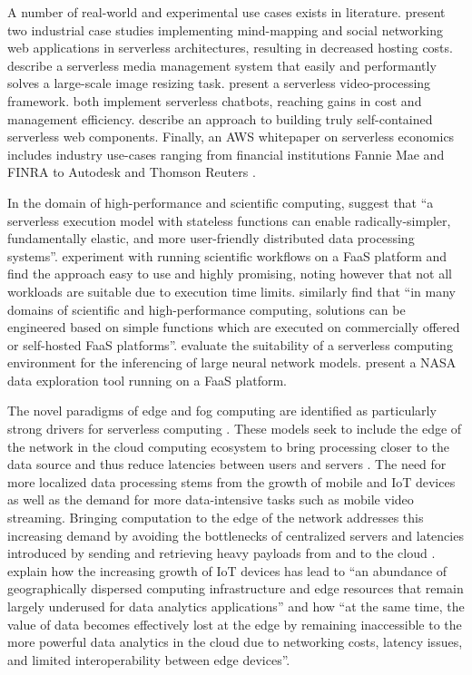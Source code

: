 A number of real-world and experimental use cases exists in literature. \textcite{adzic2017serverless} present two industrial case studies implementing mind-mapping and social networking web applications in serverless architectures, resulting in decreased hosting costs. \textcite{mcgrath16cloudEventParadigms} describe a serverless media management system that easily and performantly solves a large-scale image resizing task. \textcite{fouladi2017encoding} present a serverless video-processing framework. \textcite{yan16chatbot,lehva18chatbot} both implement serverless chatbots, reaching gains in cost and management efficiency. \textcite{ast17webcomponent} describe an approach to building truly self-contained serverless web components. Finally, an AWS whitepaper on serverless economics includes industry use-cases ranging from financial institutions Fannie Mae and FINRA to Autodesk and Thomson Reuters \parencite{aws17economics}.

In the domain of high-performance and scientific computing, \textcite{jonas17occupy} suggest that ``a serverless execution model with stateless functions can enable radically-simpler, fundamentally elastic, and more user-friendly distributed data processing systems''. \textcite{malawski17executescientific} experiment with running scientific workflows on a FaaS platform and find the approach easy to use and highly promising, noting however that not all workloads are suitable due to execution time limits. \textcite{spillner18faaster} similarly find that ``in many domains of scientific and high-performance computing, solutions can be engineered based on simple functions which are executed on commercially offered or self-hosted FaaS platforms''. \textcite{ishakian17neural} evaluate the suitability of a serverless computing environment for the inferencing of large neural network models. \textcite{petrenko17nasa} present a NASA data exploration tool running on a FaaS platform.

The novel paradigms of edge and fog computing are identified as particularly strong drivers for serverless computing \parencite{fox17}. These models seek to include the edge of the network in the cloud computing ecosystem to bring processing closer to the data source and thus reduce latencies between users and servers \parencite{buyya2017manifesto}. The need for more localized data processing stems from the growth of mobile and IoT devices as well as the demand for more data-intensive tasks such as mobile video streaming. Bringing computation to the edge of the network addresses this increasing demand by avoiding the bottlenecks of centralized servers and latencies introduced by sending and retrieving heavy payloads from and to the cloud \parencite{baresi17edgecomputing}. \textcite{nastic17analyticsedge} explain how the increasing growth of IoT devices has lead to ``an abundance of geographically dispersed computing infrastructure and edge resources that remain largely underused for data analytics applications'' and how ``at the same time, the value of data becomes effectively lost at the edge by remaining inaccessible to the more powerful data analytics in the cloud due to networking costs, latency issues, and limited interoperability between edge devices''.

